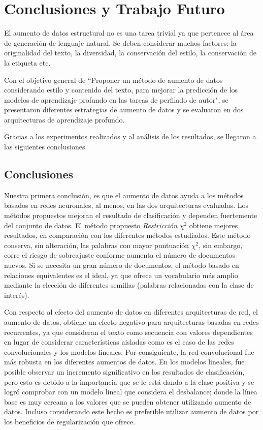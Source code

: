 
\chapter{Conclusiones y Trabajo Futuro}
El aumento de datos estructural no es una tarea trivial ya que pertenece al área de generación de lenguaje natural. Se deben considerar muchos factores: la originalidad del texto, la diversidad, la conservación del estilo, la conservación de la etiqueta etc. 

Con el objetivo general de ``Proponer un método de aumento de datos considerando  estilo y contenido del texto, para mejorar la predicción de los modelos de aprendizaje profundo en las tareas de perfilado de autor", se presentaron diferentes estrategias de aumento de datos y se evaluaron en dos arquitecturas de aprendizaje profundo. 

Gracias a los experimentos realizados y al análisis de los resultados, se llegaron a las siguientes conclusiones.

\section{Conclusiones}

Nuestra primera conclusión, es que el aumento de datos ayuda a los métodos basados en redes neuronales, al menos, en las dos arquitecturas evaluadas. Los métodos propuestos mejoran el resultado de clasificación y dependen fuertemente del conjunto de datos.
El método propuesto \textit{Restricción} $\chi^2$ obtiene mejores resultados, en comparación con los diferentes métodos estudiados. Este método conserva, sin alteración, las palabras con mayor puntuación $\chi^2$, sin embargo, corre el riesgo de sobreajuste conforme aumenta el número de documentos nuevos. Si se necesita un gran número de documentos, el método basado en relaciones equivalentes es el ideal, ya que ofrece un vocabulario más amplio mediante la elección de diferentes semillas (palabras relacionadas con la clase de interés).

Con respecto al efecto del aumento de datos en diferentes arquitecturas de red, el aumento de datos, obtiene un efecto negativo para arquitecturas basadas en redes recurrentes, ya que consideran el texto como secuencia con valores dependientes en lugar de considerar características aisladas como es el caso de las redes convolucionales y los modelos lineales. Por consiguiente, la red convolucional fue más robusta en los diferentes aumentos de datos. En los modelos lineales, fue posible observar un incremento significativo en los resultados de clasificación, pero esto es debido a la importancia que se le está dando a la clase positiva y se logró comprobar con un modelo lineal que considera el desbalance; donde la línea base es muy cercana a los valores que se pueden obtener utilizando aumento de datos. Incluso considerando este hecho es preferible utilizar aumento de datos por los beneficios de regularización que ofrece.

